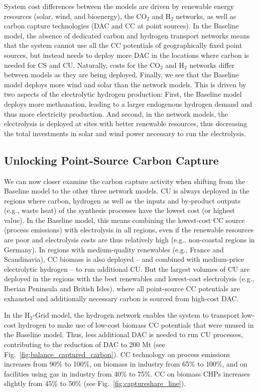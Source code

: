 \documentclass[twocolumn]{article}
\newcommand{\carbon}{CO$_2$}
\newcommand{\hydrogen}{H$_2$}
\newcommand{\modBase}{Baseline model}
\newcommand{\modH}{H$_2$-Grid model}
\begin{document}
System cost differences between the models are driven by renewable energy resources (solar, wind, and bioenergy), the \carbon{} and \hydrogen{} networks, as well as carbon capture technologies (DAC and CC at point sources).
In the Baseline model, the absence of dedicated carbon and hydrogen transport networks means that the system cannot use all the CC potentials of geographically fixed point sources, but instead needs to deploy more DAC in the locations where carbon is needed for CS and CU.
Naturally, costs for the \carbon{} and \hydrogen{} networks differ between models as they are being deployed.
Finally, we see that the Baseline model deploys more wind and solar than the network models. This is driven by two aspects of the electrolytic hydrogen production: First, the Baseline model deploys more methanation, leading to a larger endogenous hydrogen demand and thus more electricity production. And second, in the network models, the electrolysis is deployed at sites with better renewable resources, thus decreasing the total investments in solar and wind power necessary to run the electrolysis.

\subsection*{Unlocking Point-Source Carbon Capture}

We can now closer examine the carbon capture activity when shifting from the \modBase{} to the other three network models.
CU is always deployed in the regions where carbon, hydrogen as well as the inputs and by-product outputs (e.g., waste heat) of the synthesis processes have the lowest cost (or highest value). In the \modBase{}, this means combining the lowest-cost CC source (process emissions) with electrolysis in all regions, even if the renewable resources are poor and electrolysis costs are thus relatively high (e.g., non-coastal regions in Germany). In regions with medium-quality renewables (e.g., France and Scandinavia), CC biomass is also deployed -- and combined with medium-price electrolytic hydrogen -- to run additional CU. But the largest volumes of CU are deployed in the regions with the best renewables and lowest-cost electrolysis (e.g., Iberian Peninsula and British Isles), where all point-source CC potentials are exhausted and additionally necessary carbon is sourced from high-cost DAC.

In the \modH{}, the hydrogen network enables the system to transport low-cost hydrogen to make use of low-cost biomass CC potentials that were unused in the \modBase{}. Thus, less additional DAC is needed to run CU processes, contributing to the reduction of DAC to \label{}200 Mt (see Fig.~\ref{fig:balance_captured_carbon}).
CC technology on process emissions increases from \label{}90\% to \label{}100\%, on biomass in industry from \label{}65\% to \label{}100\%, and on facilities using gas in industry from \label{}40\% to \label{}75\%. CC on biomass CHPs increases slightly from \label{}45\% to \label{}50\% (see Fig.~\ref{fig:captureshare_line}).
\end{document}
